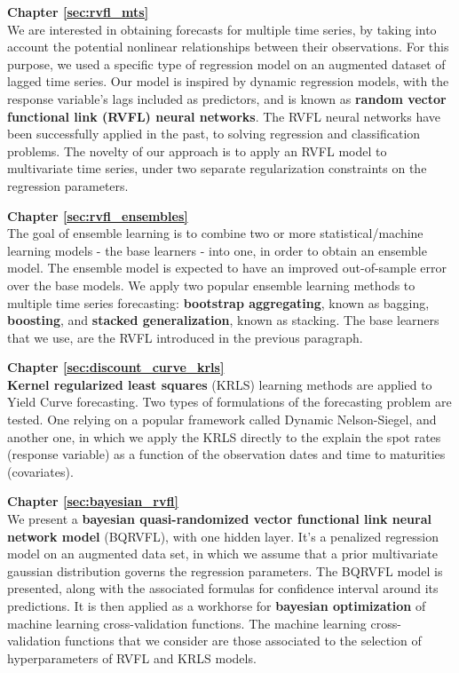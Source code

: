 \textbf{Chapter \ref{sec:rvfl_mts}} \\[0.2em]
We are interested in obtaining forecasts for multiple time series, by taking into account the potential nonlinear relationships between their observations. For this purpose, we used a specific type of regression model on an augmented dataset of lagged time series. Our model is inspired by dynamic regression models, with the response variable's lags included as predictors, and is known as \textbf{random vector functional link (RVFL) neural networks}. The RVFL neural networks have been successfully applied in the past, to solving regression and classification problems. The novelty of our approach is to apply an RVFL model to multivariate time series, under two separate regularization constraints on the regression parameters.

\textbf{Chapter \ref{sec:rvfl_ensembles}} \\[0.2em]
The goal of ensemble learning is to combine two or more statistical/machine learning models - the base learners - into one, in order to obtain an ensemble model. The ensemble model is expected to have an improved out-of-sample error over the base models. We apply two popular ensemble learning methods to multiple time series forecasting: \textbf{bootstrap aggregating}, known as bagging, \textbf{boosting}, and \textbf{stacked generalization}, known as stacking. The base learners that we use, are the RVFL introduced in the previous paragraph.

\textbf{Chapter \ref{sec:discount_curve_krls}} \\[0.2em]
\textbf{Kernel regularized least squares} (KRLS) learning methods are applied to Yield Curve forecasting. Two types of formulations of the forecasting problem are tested. One relying on a popular framework called Dynamic Nelson-Siegel, and another one, in which we apply the KRLS directly to the explain the spot rates (response variable) as a function of the observation dates and time to maturities (covariates).

\textbf{Chapter \ref{sec:bayesian_rvfl}} \\[0.2em]
We present a \textbf{bayesian quasi-randomized vector functional link neural network model} (BQRVFL), with one hidden layer. It's a penalized regression model on an augmented data set, in which we assume that a prior multivariate gaussian distribution governs the regression parameters. The BQRVFL model is presented, along with the associated formulas for confidence interval around its predictions. It is then applied as a workhorse for \textbf{bayesian optimization} of machine learning cross-validation functions. The machine learning cross-validation functions that we consider are those associated to the selection of hyperparameters of RVFL and KRLS models.
